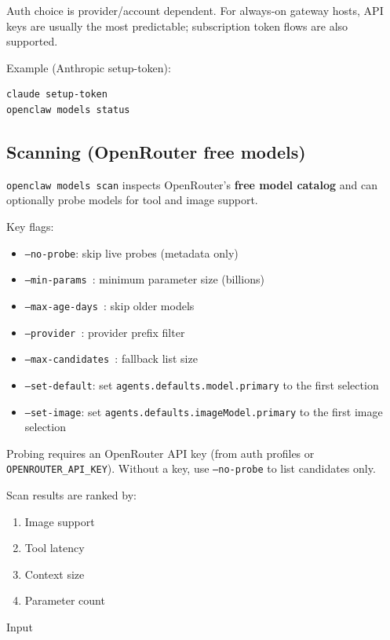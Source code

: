 Auth choice is provider/account dependent. For always-on gateway hosts, API keys are usually the most predictable; subscription token flows are also supported.

Example (Anthropic setup-token):

\begin{lstlisting}[language=bash]
claude setup-token
openclaw models status
\end{lstlisting}


\subsection{Scanning (OpenRouter free models)}


\texttt{openclaw models scan} inspects OpenRouter’s \textbf{free model catalog} and can
optionally probe models for tool and image support.

Key flags:

\begin{itemize}
  \item \texttt{--no-probe}: skip live probes (metadata only)
  \item \texttt{--min-params }: minimum parameter size (billions)
  \item \texttt{--max-age-days }: skip older models
  \item \texttt{--provider }: provider prefix filter
  \item \texttt{--max-candidates }: fallback list size
  \item \texttt{--set-default}: set \texttt{agents.defaults.model.primary} to the first selection
  \item \texttt{--set-image}: set \texttt{agents.defaults.imageModel.primary} to the first image selection
\end{itemize}


Probing requires an OpenRouter API key (from auth profiles or
\texttt{OPENROUTER\_API\_KEY}). Without a key, use \texttt{--no-probe} to list candidates only.

Scan results are ranked by:

\begin{enumerate}
  \item Image support
  \item Tool latency
  \item Context size
  \item Parameter count
\end{enumerate}


Input

